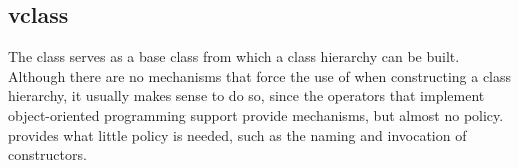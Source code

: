 %
%
%
%
%

\subsection{vclass}
\label{sec:vclass}

The  class serves as a base class from which a class hierarchy
can be built.  Although there are no mechanisms that force the use of
 when constructing a class hierarchy, it usually makes sense
to do so, since the operators that implement object-oriented programming support
provide mechanisms, but almost no policy.   provides what
little policy is needed, such as the naming and invocation of constructors.

